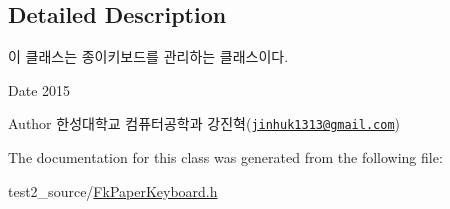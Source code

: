 \subsection{Detailed Description}
이 클래스는 종이키보드를 관리하는 클래스이다. 

\begin{DoxyDate}{Date}
2015 
\end{DoxyDate}
\begin{DoxyAuthor}{Author}
한성대학교 컴퓨터공학과 강진혁(\href{mailto:jinhuk1313@gmail.com}{\tt jinhuk1313@gmail.\+com}) 
\end{DoxyAuthor}


The documentation for this class was generated from the following file\+:\begin{DoxyCompactItemize}
\item 
test2\+\_\+source/\hyperlink{_fk_paper_keyboard_8h}{Fk\+Paper\+Keyboard.\+h}\end{DoxyCompactItemize}
